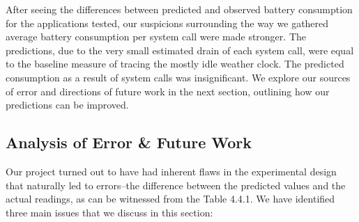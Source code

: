 \documentclass[11pt]{article}
\begin{document}
After seeing the differences between predicted and observed battery consumption for the applications tested, our suspicions surrounding 
the way we gathered average battery consumption per system call were made stronger. The predictions, due to the very small estimated 
drain of each system call, were equal to the baseline measure of tracing the mostly idle weather clock.  The predicted consumption 
as a result of system calls was insignificant.  We explore our sources of error and directions of future work in the next section, 
outlining how our predictions can be improved. 

\subsection{Analysis of Error \& Future Work}
Our project turned out to have had inherent flaws in the experimental design that naturally led to errors--the difference between the predicted 
values and the actual readings, as can be witnessed from the Table 4.4.1. We have identified three main issues that we discuss 
in this section:
\end{document}
